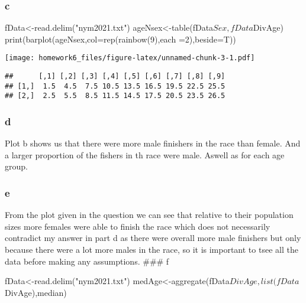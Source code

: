 \documentclass[
  12pt,
]{article}
\newenvironment{Shaded}{\begin{snugshade}}{\end{snugshade}}
\newcommand{\NormalTok}[1]{#1}
\begin{document}
\hypertarget{c}{%
\subsubsection{c}\label{c}}

\begin{Shaded}
\begin{Highlighting}[]
\NormalTok{fData\textless{}{-}read.delim("nym2021.txt")}
\NormalTok{ageNsex\textless{}{-}table(fData$Sex,fData$DivAge)}
\NormalTok{print(barplot(ageNsex,col=rep(rainbow(9),each =2),beside=T))}
\end{Highlighting}
\end{Shaded}

\texttt{[image: homework6\_files/figure-latex/unnamed-chunk-3-1.pdf]}

\begin{verbatim}
##      [,1] [,2] [,3] [,4] [,5] [,6] [,7] [,8] [,9]
## [1,]  1.5  4.5  7.5 10.5 13.5 16.5 19.5 22.5 25.5
## [2,]  2.5  5.5  8.5 11.5 14.5 17.5 20.5 23.5 26.5
\end{verbatim}

\hypertarget{d}{%
\subsubsection{d}\label{d}}

\newline

Plot b shows us that there were more male finishers in the race than
female. And a larger proportion of the fishers in th race were male.
Aswell as for each age group.

\hypertarget{e}{%
\subsubsection{e}\label{e}}

\newline

From the plot given in the question we can see that relative to their
population sizes more females were able to finish the race which does
not necessarily contradict my answer in part d as there were overall
more male finishers but only because there were a lot more males in the
race, so it is important to tsee all the data before making any
assumptions. \#\#\# f

\begin{Shaded}
\begin{Highlighting}[]
\NormalTok{fData\textless{}{-}read.delim("nym2021.txt")}
\NormalTok{medAge\textless{}{-}aggregate(fData$DivAge,list(fData$DivAge),median)}
\end{Highlighting}
\end{Shaded}
\end{document}
